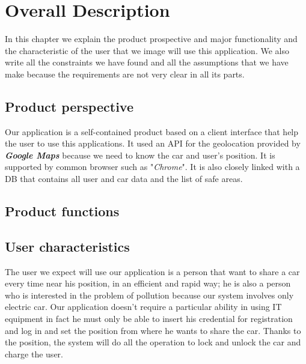 \section{Overall Description} \label{sec:description}
In this chapter we explain the product prospective and major functionality and the characteristic of the user that we image will use this application. We also write all the constraints we have found and all the assumptions that we have make because the requirements are not very clear in all its parts. 

\subsection{Product perspective} \label{subsec:prod_persp}
Our application is a self-contained product based on a client interface that help the user to use this applications. It used an API for the geolocation provided by \emph{\textbf{Google Maps}} because we need to know the car and user's position. It is supported by common browser such as "\emph{Chrome}". It is also closely linked with a DB that contains all user and car data and the list of safe areas.



\subsection{Product functions} \label{subsec:prod_funct}


\subsection{User characteristics} \label{subsec:user_char}
The user we expect will use our application is a person that want to share a car every time near his position, in an efficient and  rapid way; he is also a person who is interested in the problem of pollution because our system involves only electric car. Our application doesn't require a particular ability in using IT equipment in fact he must only be able to insert his credential for registration and log in and set the position from where he wants to share the car. Thanks to the position, the system will do all the operation to lock and unlock the car and charge the user.

